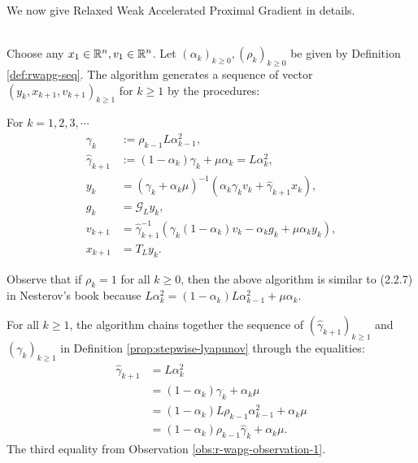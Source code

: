 \documentclass[12pt]{article}
\begin{document}
    We now give Relaxed Weak Accelerated Proximal Gradient in details.
    \begin{definition}\label{def:wapg}\;\\
        Choose any $x_1 \in \mathbb R^n, v_1 \in \mathbb R^n$. 
        Let $(\alpha_k)_{k \ge0}, (\rho_k)_{k \ge 0}$ be given by Definition \ref{def:rwapg-seq}. 
        The algorithm generates a sequence of vector $(y_k, x_{k + 1}, v_{k + 1})_{k \ge 1}$ for $k\ge 1$ by the procedures:  
        \begin{tcolorbox}
            For $k=1, 2, 3, \cdots$
            \begin{align*}
                \gamma_k &:= \rho_{k -1}L\alpha_{k - 1}^2, 
                \\
                \hat \gamma_{k + 1} & := (1 - \alpha_k)\gamma_k + \mu \alpha_k = L\alpha_k^2, 
                \\
                y_k &= 
                (\gamma_k + \alpha_k \mu)^{-1}(\alpha_k \gamma_k v_k + \hat\gamma_{k + 1} x_k), 
                \\
                g_k &= \mathcal G_L y_k, 
                \\
                v_{k + 1} &= 
                \hat\gamma^{-1}_{k + 1}
                (\gamma_k(1 - \alpha_k) v_k - \alpha_k g_k + \mu \alpha_k y_k), 
                \\
                x_{k + 1} &= T_L y_k. 
            \end{align*}    
        \end{tcolorbox}
    \end{definition}
    \begin{observation}\label{obs:r-wapg-observation-2}
        Observe that if $\rho_k = 1$ for all $k\ge 0$, then the above algorithm is similar to (2.2.7) in Nesterov's book \cite{nesterov_lectures_2018} because $L\alpha_k^{2} = (1 - \alpha_k)L\alpha_{k - 1}^2 + \mu \alpha_k$. 
        \par
        For all $k \ge 1$, the algorithm chains together the sequence of $(\hat \gamma_{k+1})_{k \ge 1}$ and $(\gamma_k)_{k \ge 1}$ in Definition \ref{prop:stepwise-lyapunov} through the equalities: 
        \begin{align*}
            \hat \gamma_{k + 1} 
            &= L\alpha_k^2 
            \\
            &= (1 - \alpha_k)\gamma_k + \alpha_k \mu
            \\
            &= (1 - \alpha_k)L\rho_{k - 1}\alpha_{k - 1}^2 + \alpha_k \mu
            \\
            &= (1 - \alpha_k)\rho_{k - 1}\hat \gamma_{k} + \alpha_k \mu. 
        \end{align*}
        The third equality from Observation \ref{obs:r-wapg-observation-1}. 
    \end{observation}
\end{document}
